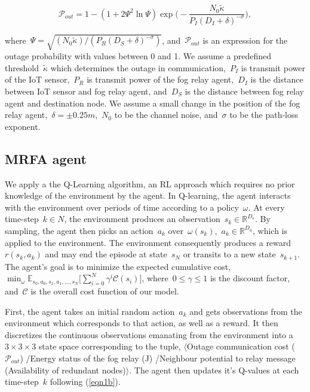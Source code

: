 \documentclass[journal]{IEEEtran}
\begin{document}
\begin{equation}\label{eqn1a}
  \mathcal{P}_{out} = 1 - (1 + 2\Psi^2 \ln \Psi) \exp\Big( -\frac{N_0 \tilde{\kappa}}{P_{I} (D_{I} + \delta)^{-\sigma}}\Big),
\end{equation}


where~$\Psi = \sqrt{(N_0 \tilde{\kappa})/(P_{R}(D_{S} + \delta)^{-\sigma})}$, and~$\mathcal{P}_{out}$ is an expression for the outage probability with values between 0 and 1. We assume a predefined threshold~$\tilde{\kappa}$ which determines the outage in communication,~$P_{I}$ is transmit power of the IoT sensor,~$P_{R}$ is transmit power of the fog relay agent,~$D_{I}$ is the distance between IoT sensor and fog relay agent, and~$D_{S}$ is the distance between fog relay agent and destination node. We assume a small change in the position of the fog relay agent,~$\delta = \pm0.25 m$,~$N_0$ to be the channel noise, and~$\sigma$ to be the path-loss exponent.

\subsection{MRFA agent}
We apply a the Q-Learning algorithm, an RL approach which requires no prior knowledge of the environment by the agent. In Q-learning, the agent interacts with the environment over periods of time according to a policy~$\omega$. At every time-step~$k \in N$, the environment produces an observation~$s_{k} \in \mathbb{R}^{D_s}$. By sampling, the agent then picks an action~$a_{k}$ over~$\omega(s_{k})$,~$a_{k} \in \mathbb{R}^{D_a}$, which is applied to the environment. The environment consequently produces a reward~$r(s_{k}, a_{k})$ and may end the episode at state~$s_{N}$ or transits to a new state~$s_{k + 1}$. The agent's goal is to minimize the expected cumulative cost,~$\min_{\omega} \mathbb{E}_{s_0, a_0, s_1, a_1, ..., s_N} \Big[ \sum_{i=0}^{N} \gamma^i \mathcal{C}(s_i) \Big]$, where~$0 \leq \gamma \leq 1$ is the discount factor, and~$\mathcal{C}$ is the overall cost function of our model.

First, the agent takes an initial random action~$a_{k}$ and gets observations from the environment which corresponds to that action, as well as a reward. It then discretizes the continuous observations emanating from the environment into a~$3 \times 3 \times 3$ state space corresponding to the tuple, $\langle$Outage communication cost ($\mathcal{P}_{out}$) /Energy status of the fog relay (J) /Neighbour potential to relay message (Availability of redundant nodes)$\rangle$. The agent then updates it's Q-values at each time-step~$k$ following (\ref{eqn1b}).
\end{document}
